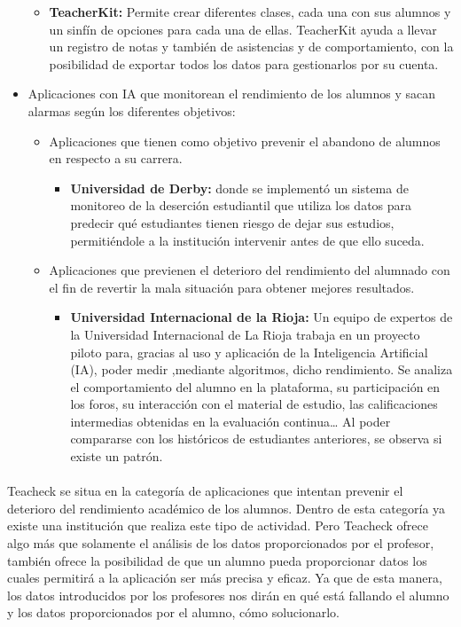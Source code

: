 \begin{itemize}
\begin{itemize}
\item \textbf{TeacherKit:} Permite crear diferentes clases, cada una con sus alumnos y un sinfín de opciones para cada una de ellas. TeacherKit ayuda a llevar un registro de notas y también de asistencias y de comportamiento, con la posibilidad de exportar todos los datos para gestionarlos por su cuenta.
\end{itemize}
\item Aplicaciones con IA que monitorean el rendimiento de los alumnos y sacan alarmas según los diferentes objetivos:
\begin{itemize}
\item Aplicaciones que tienen como objetivo prevenir el abandono de alumnos en respecto a su carrera.
\begin{itemize}
\item \textbf{Universidad de Derby:} donde se implementó un sistema de monitoreo de la deserción estudiantil que utiliza los datos para predecir qué estudiantes tienen riesgo de dejar sus estudios, permitiéndole a la institución intervenir antes de que ello suceda.\cite{riesgoDejarEstudios}
\end{itemize}
\item Aplicaciones que previenen el deterioro del rendimiento del alumnado con el fin de revertir la mala situación para obtener mejores resultados.
\begin{itemize}
\item \textbf{Universidad Internacional de la Rioja:} Un equipo de expertos de la Universidad Internacional de La Rioja trabaja en un proyecto piloto para, gracias al uso y aplicación de la Inteligencia Artificial (IA), poder medir ,mediante algoritmos, dicho rendimiento. Se analiza el comportamiento del alumno en la plataforma, su participación en los foros, su interacción con el material de estudio, las calificaciones intermedias obtenidas en la evaluación continua… Al poder compararse con los históricos de estudiantes anteriores, se observa si existe un patrón.\cite{rendimientoAlumnos}
\end{itemize}
\end{itemize}
\end{itemize}

\paragraph{} Teacheck se situa en la categoría de aplicaciones que intentan prevenir el deterioro del rendimiento académico de los alumnos. Dentro de esta categoría ya existe una institución que realiza este tipo de actividad. Pero Teacheck ofrece algo más que solamente el análisis de los datos proporcionados por el profesor, también ofrece la posibilidad de que un alumno pueda proporcionar datos los cuales permitirá a la aplicación ser más precisa y eficaz.
Ya que de esta manera, los datos introducidos por los profesores nos dirán en qué está fallando el alumno y los datos proporcionados por el alumno, cómo solucionarlo.


